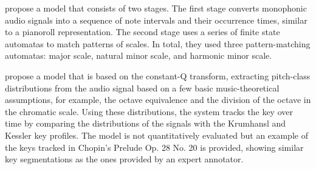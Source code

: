 \textcite{izmirli1994recognition} propose a model that
consists of two stages. The first stage converts monophonic
audio signals into a sequence of note intervals and their
occurrence times, similar to a pianoroll representation. The
second stage uses a series of finite state automatas to
match patterns of scales. In total, they used three
pattern-matching automatas: major scale, natural minor
scale, and harmonic minor scale.


\textcite{purwins2000new} propose a model that is based on
the constant-Q transform, extracting pitch-class
distributions from the audio signal based on a few basic
music-theoretical assumptions, for example, the octave
equivalence and the division of the octave in the chromatic
scale. Using these distributions, the system tracks the key
over time by comparing the distributions of the signals with
the Krumhansl and Kessler key profiles. The model is not
quantitatively evaluated but an example of the keys tracked
in Chopin's Prelude Op. 28 No. 20 is provided, showing
similar key segmentations as the ones provided by an expert
annotator.



